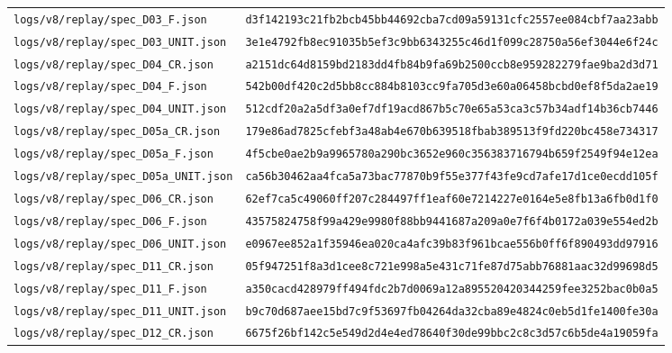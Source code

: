 \documentclass[11pt,a4paper]{article}
\newcommand{\loc}[1]{\nolinkurl{#1}}
\theoremstyle{plain}
\theoremstyle{definition}
\theoremstyle{remark}
\numberwithin{equation}{section}
\begin{document}
{\begin{longtable}{@{}p{.50\linewidth}p{.46\linewidth}@{}}
{\scriptsize\loc{logs/v8/replay/spec_D03_F.json}} & \texttt{\tiny d3f142193c21fb2bcb45bb44692cba7cd09a59131cfc2557ee084cbf7aa23abb}\\
{\scriptsize\loc{logs/v8/replay/spec_D03_UNIT.json}} & \texttt{\tiny 3e1e4792fb8ec91035b5ef3c9bb6343255c46d1f099c28750a56ef3044e6f24c}\\
{\scriptsize\loc{logs/v8/replay/spec_D04_CR.json}} & \texttt{\tiny a2151dc64d8159bd2183dd4fb84b9fa69b2500ccb8e959282279fae9ba2d3d71}\\
{\scriptsize\loc{logs/v8/replay/spec_D04_F.json}} & \texttt{\tiny 542b00df420c2d5bb8cc884b8103cc9fa705d3e60a06458bcbd0ef8f5da2ae19}\\
{\scriptsize\loc{logs/v8/replay/spec_D04_UNIT.json}} & \texttt{\tiny 512cdf20a2a5df3a0ef7df19acd867b5c70e65a53ca3c57b34adf14b36cb7446}\\
{\scriptsize\loc{logs/v8/replay/spec_D05a_CR.json}} & \texttt{\tiny 179e86ad7825cfebf3a48ab4e670b639518fbab389513f9fd220bc458e734317}\\
{\scriptsize\loc{logs/v8/replay/spec_D05a_F.json}} & \texttt{\tiny 4f5cbe0ae2b9a9965780a290bc3652e960c356383716794b659f2549f94e12ea}\\
{\scriptsize\loc{logs/v8/replay/spec_D05a_UNIT.json}} & \texttt{\tiny ca56b30462aa4fca5a73bac77870b9f55e377f43fe9cd7afe17d1ce0ecdd105f}\\
{\scriptsize\loc{logs/v8/replay/spec_D06_CR.json}} & \texttt{\tiny 62ef7ca5c49060ff207c284497ff1eaf60e7214227e0164e5e8fb13a6fb0d1f0}\\
{\scriptsize\loc{logs/v8/replay/spec_D06_F.json}} & \texttt{\tiny 43575824758f99a429e9980f88bb9441687a209a0e7f6f4b0172a039e554ed2b}\\
{\scriptsize\loc{logs/v8/replay/spec_D06_UNIT.json}} & \texttt{\tiny e0967ee852a1f35946ea020ca4afc39b83f961bcae556b0ff6f890493dd97916}\\
{\scriptsize\loc{logs/v8/replay/spec_D11_CR.json}} & \texttt{\tiny 05f947251f8a3d1cee8c721e998a5e431c71fe87d75abb76881aac32d99698d5}\\
{\scriptsize\loc{logs/v8/replay/spec_D11_F.json}} & \texttt{\tiny a350cacd428979ff494fdc2b7d0069a12a895520420344259fee3252bac0b0a5}\\
{\scriptsize\loc{logs/v8/replay/spec_D11_UNIT.json}} & \texttt{\tiny b9c70d687aee15bd7c9f53697fb04264da32cba89e4824c0eb5d1fe1400fe30a}\\
{\scriptsize\loc{logs/v8/replay/spec_D12_CR.json}} & \texttt{\tiny 6675f26bf142c5e549d2d4e4ed78640f30de99bbc2c8c3d57c6b5de4a19059fa}\\

\end{longtable}}
\end{document}
